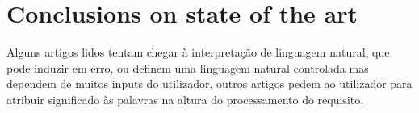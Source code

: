 \section{Conclusions on state of the art}
\label{sec:sota_conclusions}

Alguns artigos lidos tentam chegar à interpretação de linguagem natural, que pode induzir em erro, ou definem uma linguagem natural controlada mas dependem de muitos inputs do utilizador, outros artigos pedem ao utilizador para atribuir significado às palavras na altura do processamento do requisito.

